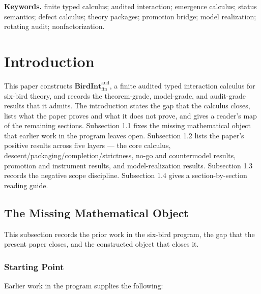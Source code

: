 \documentclass[11pt]{article}
\theoremstyle{definition}
\begin{document}
\medskip
\noindent\textbf{Keywords.} finite typed calculus; audited interaction; emergence calculus; status semantics; defect calculus; theory packages; promotion bridge; model realization; rotating audit; nonfactorization.

\section{Introduction}

This paper constructs \(\mathbf{BirdInt}^{\mathrm{aud}}_{\mathrm{fin}}\), a finite audited typed interaction calculus for six-bird theory, and records the theorem-grade, model-grade, and audit-grade results that it admits. The introduction states the gap that the calculus closes, lists what the paper proves and what it does not prove, and gives a reader's map of the remaining sections. Subsection 1.1 fixes the missing mathematical object that earlier work in the program leaves open. Subsection 1.2 lists the paper's positive results across five layers --- the core calculus, descent/packaging/completion/strictness, no-go and countermodel results, promotion and instrument results, and model-realization results. Subsection 1.3 records the negative scope discipline. Subsection 1.4 gives a section-by-section reading guide.

\subsection{The Missing Mathematical Object}

This subsection records the prior work in the six-bird program, the gap that the present paper closes, and the constructed object that closes it.

\subsubsection{Starting Point}

Earlier work in the program supplies the following:
\end{document}
